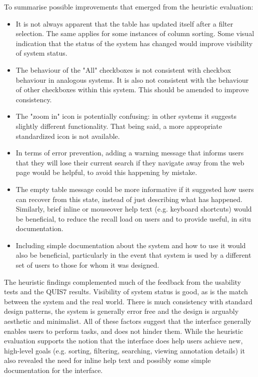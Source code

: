 To summarise possible improvements that emerged from the heuristic evaluation:
\begin{itemize}
 \item It is not always apparent that the table has updated itself after a filter selection. The same applies for some instances of column sorting. Some visual indication that the status of the system has changed would improve visibility of system status. 
 \item The behaviour of the "All" checkboxes is not consistent with checkbox behaviour in analogous systems. It is also not consistent with the behaviour of other checkboxes within this system. This should be amended to improve consistency.  
 \item The "zoom in" icon is potentially confusing: in other systems it suggests slightly different functionality. That being said, a more appropriate standardized icon is not available. 
 \item In terms of error prevention, adding a warning message that informs users that they will lose their current search if they navigate away from the web page would be helpful, to avoid this happening by mistake. 
 \item The empty table message could be more informative if it suggested how users can recover from this state, instead of just describing what has happened. Similarly, brief inline or mouseover help text (e.g. keyboard shortcuts) would be beneficial, to reduce the recall load on users and to provide useful, in situ documentation. 
 \item Including simple documentation about the system and how to use it would also be beneficial, particularly in the event that system is used by a different set of users to those for whom it was designed. 
\end{itemize}

The heuristic findings complemented much of the feedback from the usability tests and the QUIS7 results. Visibility of system status is good, as is the match between the system and the real world. There is much consistency with standard design patterns, the system is generally error free and the design is arguably aesthetic and minimalist. All of these factors suggest that the interface generally enables users to perform tasks, and does not hinder them. While the heuristic evaluation supports the notion that the interface does help users achieve new, high-level goals (e.g. sorting, filtering, searching, viewing annotation details) it also revealed the need for inline help text and possibly some simple documentation for the interface. 



